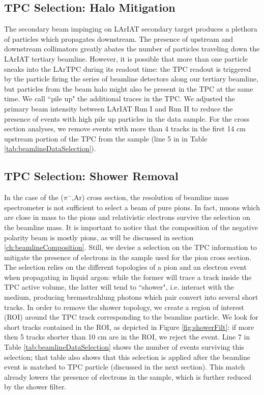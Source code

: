 \subsection{TPC Selection: Halo Mitigation }\label{ch:pileUp}
The secondary beam impinging on LArIAT secondary target produces a plethora of particles which propagates downstream. The presence of upstream and downstream collimators greatly abates the number of particles traveling down the LArIAT tertiary beamline. However, it is possible that more than one particle sneaks into the LArTPC during its readout time: the TPC readout is triggered by the particle  firing the series of beamline detectors along our tertiary beamline, but particles from the beam halo might also be present in the TPC at the same time. We call ``pile up" the additional traces in the TPC. We adjusted the primary beam intensity between LArIAT Run I and Run II to reduce the presence of events with high pile up particles in the data sample. For the cross section analyses, we remove events with more than 4 tracks in the first 14 cm upstream portion of the TPC from the sample (line 5 in in Table \ref{tab:beamlineDataSelection}).


\subsection{TPC Selection: Shower Removal}\label{ch:electrons}
In the case of the ($\pi^-$,Ar) cross section, the resolution of  beamline mass spectrometer is not sufficient to select a beam of pure pions. In fact,  muons which are close in mass to the pions and relativistic electrons survive the selection on the beamline mass.  It is important to notice that the composition of the negative polarity beam is mostly pions, as will be discussed in section \ref{ch:beamlineComposition}.
Still, we devise a selection on the TPC information to mitigate the presence of electrons in the sample used for the pion cross section. The selection relies on the different topologies of a pion and an electron event when propagating in liquid argon: while the former will trace a track inside the TPC active volume, the latter will tend to ``shower", i.e. interact with the medium, producing bremsstrahlung photons which pair convert into several short tracks. In order to remove the shower topology, we create a region of interest (ROI) around the TPC track corresponding to the beamline particle. We look for short tracks contained in the ROI, as depicted in Figure \ref{fig:showerFilt}:  if more then 5 tracks shorter than 10 cm are in the ROI, we reject the event. Line 7 in  Table \ref{tab:beamlineDataSelection} shows the number of events surviving this selection; that table also shows that this selection is applied after the beamline event is matched to TPC particle (discussed in the next section). This match already lowers the presence of electrons in the sample, which is further reduced by the shower filter.

